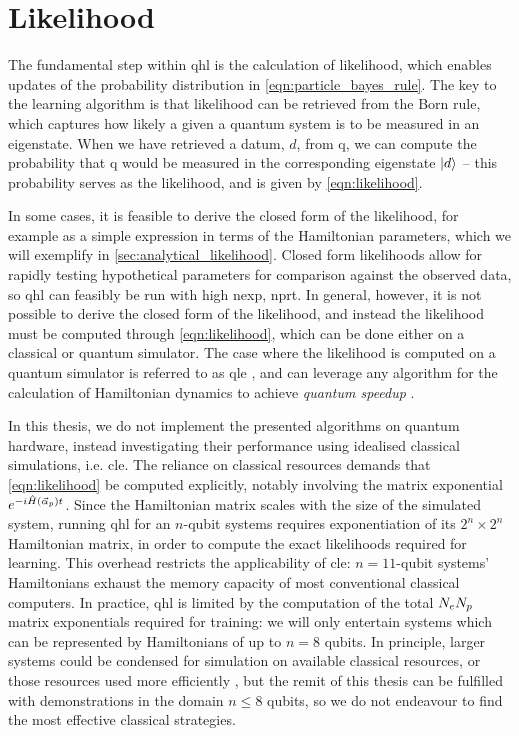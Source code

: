 \section{Likelihood}\label{sec:likelihood}
The fundamental step within \gls{qhl} is the calculation of  \gls{likelihood}, 
    which enables updates of the probability distribution in \cref{eqn:particle_bayes_rule}. 
The key to the learning algorithm is that \gls{likelihood} can be retrieved from the Born rule, 
    which captures how likely a given a quantum system is to be measured in an eigenstate.
When we have retrieved a datum, $d$, from \gls{q}, we can compute the probability that \gls{q} 
    would be measured in the corresponding eigenstate $\ket{d}$ -- this probability serves as the likelihood, 
    and is given by \cref{eqn:likelihood}.
\par 

In some cases, it is feasible to derive the closed form of the \gls{likelihood}, 
    for example as a simple expression in terms of the Hamiltonian parameters, 
    which we will exemplify in \cref{sec:analytical_likelihood}. 
Closed form likelihoods allow for rapidly testing hypothetical parameters for comparison against 
    the observed data, so \gls{qhl} can feasibly be run with high \gls{nexp}, \gls{nprt}.  
In general, however, it is not possible to derive the closed form of the likelihood, 
    and instead the \gls{likelihood} must be computed through \cref{eqn:likelihood}, 
    which can be done either on a classical or quantum simulator. 
The case where the \gls{likelihood} is computed on a quantum simulator is referred to as \gls{qle}
    \cite{Wiebe:2014qhl, wang2017experimental},
    and can leverage any algorithm for the calculation of Hamiltonian dynamics to achieve \emph{quantum speedup}
    \cite{berry2015hamiltonian, childs2018toward}. %
\par 
In this thesis, we do not implement the presented algorithms on quantum hardware,
    instead investigating their performance using idealised classical simulations, i.e. \gls{cle}. 
The reliance on classical resources demands that \cref{eqn:likelihood} be computed explicitly, 
    notably involving the matrix exponential $e^{-i\hat{H}(\vec{\alpha}_p) t}$.
Since the Hamiltonian matrix scales with the size of the simulated system,
    running \gls{qhl} for an $n$-qubit systems requires exponentiation of its $2^n \times 2^n$ Hamiltonian matrix, 
    in order to compute the exact likelihoods required for learning. 
This overhead restricts the applicability of \gls{cle}: 
    $n=11$-qubit systems' Hamiltonians exhaust the memory capacity of most conventional classical computers.
In practice, \gls{qhl} is limited by the computation of the total $N_eN_p$ matrix exponentials required for training:
    we will only entertain systems which can be represented by Hamiltonians of up to $n=8$ qubits. 
In principle, larger systems could be condensed for simulation on available classical resources, 
    or those resources used more efficiently \cite{rudi2020approximating}, 
    but the remit of this thesis can be fulfilled with demonstrations in the domain $n\leq8$ qubits, 
    so we do not endeavour to find the most effective classical strategies.
\par 

